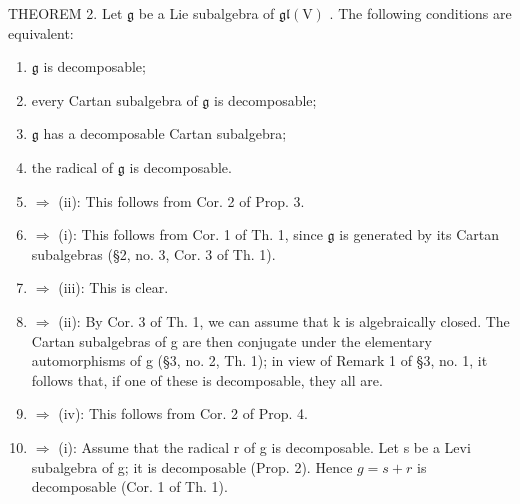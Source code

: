 THEOREM 2. Let \(\mathfrak{g}\) be a Lie subalgebra of \(\mathfrak{gl}(\mathrm{V})\) . The following conditions are equivalent:

\begin{enumerate}
\def\labelenumi{(\roman{enumi})}
\item
  \(\mathfrak{g}\) is decomposable;
\item
  every Cartan subalgebra of \(\mathfrak{g}\) is decomposable;
\item
  \(\mathfrak{g}\) has a decomposable Cartan subalgebra;
\item
  the radical of \(\mathfrak{g}\) is decomposable.
\item
  \(\Longrightarrow\) (ii): This follows from Cor. 2 of Prop. 3.
\item
  \(\Longrightarrow\) (i): This follows from Cor. 1 of Th. 1, since \(\mathfrak{g}\) is generated by its Cartan subalgebras (§2, no. 3, Cor. 3 of Th. 1).
\item
  \(\Longrightarrow\) (iii): This is clear.
\item
  \(\Longrightarrow\) (ii): By Cor. 3 of Th. 1, we can assume that k is algebraically closed. The Cartan subalgebras of g are then conjugate under the elementary automorphisms of g (§3, no. 2, Th. 1); in view of Remark 1 of §3, no. 1, it follows that, if one of these is decomposable, they all are.
\item
  \(\Longrightarrow\) (iv): This follows from Cor. 2 of Prop. 4.
\item
  \(\Longrightarrow\) (i): Assume that the radical r of g is decomposable. Let s be a Levi subalgebra of g; it is decomposable (Prop. 2). Hence \(g = s + r\) is decomposable (Cor. 1 of Th. 1).
\end{enumerate}

